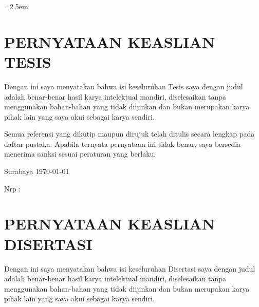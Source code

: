 \normalsize
{}
\singlespacing
\emergencystretch=2.5em

\cleardoublepage

\cleardoublepage

{
	{
\chapter*{PERNYATAAN KEASLIAN TESIS}


\begin{spacing}{1.5}
	
	Dengan ini saya menyatakan bahwa isi keseluruhan Tesis saya dengan judul \textbf{\JdTesis} adalah benar-benar hasil karya intelektual mandiri, diselesaikan tanpa menggunakan bahan-bahan yang tidak diijinkan dan bukan merupakan karya pihak lain yang saya akui sebagai karya sendiri.
	
	Semua referensi yang dikutip maupun dirujuk telah ditulis secara lengkap pada daftar pustaka. Apabila ternyata pernyataan ini tidak benar, saya bersedia menerima sanksi sesuai peraturan yang berlaku.
	
	\hspace{30ex}Surabaya \today
	
	\vspace{10ex}
	
	\hspace{35ex}\underline{\NamaMahasiswa}
	
	\hspace{35ex}Nrp :\NrpMahasiswa
	
\end{spacing}
\cleardoublepage

}
{
	
	\chapter*{PERNYATAAN KEASLIAN DISERTASI}
	
	\begin{spacing}{1.5}
		
		Dengan ini saya menyatakan bahwa isi keseluruhan Disertasi  saya dengan judul \textbf{\JdTesis} adalah benar-benar hasil karya intelektual mandiri, diselesaikan tanpa menggunakan bahan-bahan yang tidak diijinkan dan bukan merupakan karya pihak lain yang saya akui sebagai karya sendiri.
	

\end{spacing}}}

